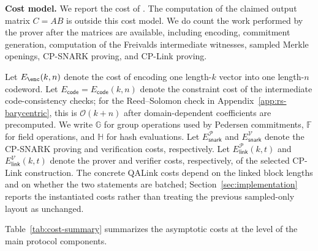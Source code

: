 \noindent\textbf{Cost model.}
We report the cost of \protocol.  The computation of the claimed output matrix \(C=AB\) is outside this cost model.
We do count the work performed by the \protocol{} prover after the matrices
are available, including encoding, commitment generation, computation of the
Freivalds intermediate witnesses, sampled Merkle openings, CP-SNARK proving,
and CP-Link proving.

Let \(E_{\enc}(k,n)\) denote the cost of encoding one length-\(k\) vector into
one length-\(n\) codeword.
Let \(E_{\mathsf{code}}=E_{\mathsf{code}}(k,n)\) denote the constraint cost of the intermediate
code-consistency checks; for the Reed--Solomon check in
Appendix~\ref{app:rs-barycentric}, this is \(\mathcal{O}(k+n)\) after
domain-dependent coefficients are precomputed.
We write \(\mathbb{G}\) for group operations used by Pedersen commitments,
\(\mathbb{F}\) for field operations, and \(\mathbb{H}\) for hash evaluations.
Let \(E_{\mathsf{snark}}^{\mathcal{P}}\) and \(E_{\mathsf{snark}}^{\mathcal{V}}\) denote the CP-SNARK proving and
verification costs, respectively. Let \(E_{\mathsf{link}}^\mathcal{P}(k,t)\) and \(E_{\mathsf{link}}^\mathcal{V}(k,t)\) denote the prover and verifier costs, respectively, of the selected CP-Link construction.
The concrete QALink costs depend on the linked block lengths and on whether
the two statements are batched; Section~\ref{sec:implementation} reports the
instantiated costs rather than treating the previous sampled-only layout as
unchanged.

Table~\ref{tab:cost-summary} summarizes the asymptotic costs at the level of
the main protocol components.

